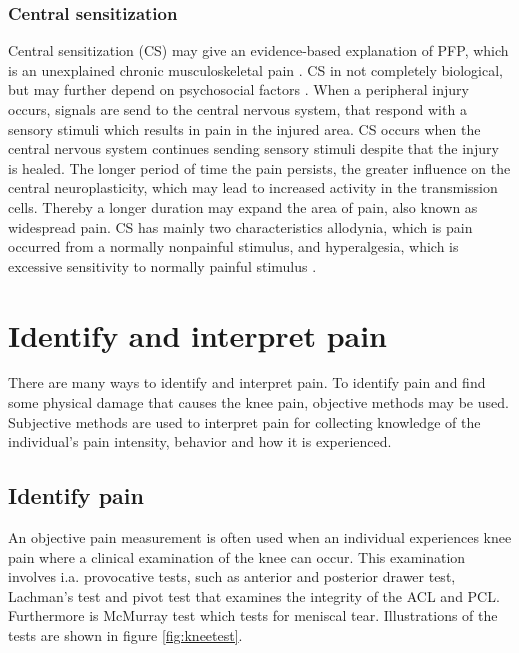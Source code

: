 \subsubsection{Central sensitization}
Central sensitization (CS) may give an evidence-based explanation of PFP, which is an unexplained chronic musculoskeletal pain \citep{Nijs2011, Matre2012}. CS in not completely biological, but may further depend on psychosocial factors \citep{Yunus2007}. \newline
\noindent
When a peripheral injury occurs, signals are send to the central nervous system, that respond with a sensory stimuli which results in pain in the injured area. CS occurs when the central nervous system continues sending sensory stimuli despite that the injury is healed. The longer period of time the pain persists, the greater influence on the central neuroplasticity, which may lead to increased activity in the transmission cells. Thereby a longer duration may expand the area of pain, also known as widespread pain.\citep{Oesteraas2010, Mayer2011, Yunus2007}\newline
\noindent
CS has mainly two characteristics allodynia, which is pain occurred from a normally nonpainful stimulus, and hyperalgesia, which is excessive sensitivity to normally painful stimulus \citep{Yunus2007, Oesteraas2010, Mayer2011,}.
\newpage

\section{Identify and interpret pain}
There are many ways to identify and interpret pain. To identify pain and find some physical damage that causes the knee pain, objective methods may be used. Subjective methods are used to interpret pain for collecting knowledge of the individual's pain intensity, behavior and how it is experienced.\citep{Younger2009}

\subsection{Identify pain}
An objective pain measurement is often used when an individual experiences knee pain where a clinical examination of the knee can occur. This examination involves i.a. provocative tests, such as anterior and posterior drawer test, Lachman’s test and pivot test that examines the integrity of the ACL and PCL. Furthermore is McMurray test which tests for meniscal tear.\citep{Ghosh2010} Illustrations of the tests are shown in figure \ref{fig:kneetest}.

